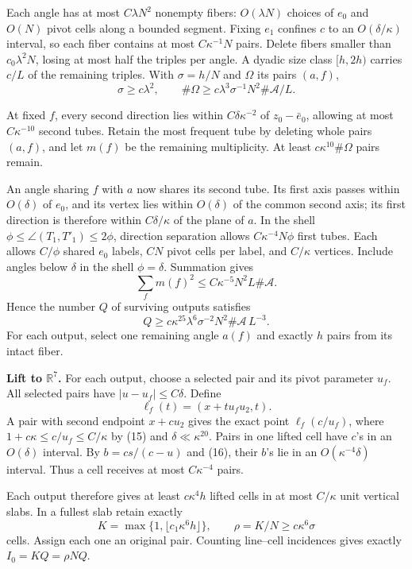 \documentclass[
  11pt,
  a4paper,
]{article}
\begin{document}
Each angle has at most \(C\lambda N^2\) nonempty fibers:
\(O(\lambda N)\) choices of \(e_0\) and \(O(N)\) pivot cells along a
bounded segment. Fixing \(e_1\) confines \(c\) to an
\(O(\delta/\kappa)\) interval, so each fiber contains at most
\(C\kappa^{-1}N\) pairs. Delete fibers smaller than \(c_0\lambda^2N\),
losing at most half the triples per angle. A dyadic size class
\([h,2h)\) carries \(c/L\) of the remaining triples. With \(\sigma=h/N\)
and \(\Omega\) its pairs \((a,f)\), \[
 \sigma\ge c\lambda^2,\qquad
 \#\Omega\ge c\lambda^3\sigma^{-1}N^2\#\mathcal A/L.
\tag{17}\label{eq:17}
\]

At fixed \(f\), every second direction lies within
\(C\delta\kappa^{-2}\) of \(z_0-\bar e_0\), allowing at most
\(C\kappa^{-10}\) second tubes. Retain the most frequent tube by
deleting whole pairs \((a,f)\), and let \(m(f)\) be the remaining
multiplicity. At least \(c\kappa^{10}\#\Omega\) pairs remain.

An angle sharing \(f\) with \(a\) now shares its second tube. Its first
axis passes within \(O(\delta)\) of \(e_0\), and its vertex lies within
\(O(\delta)\) of the common second axis; its first direction is
therefore within \(C\delta/\kappa\) of the plane of \(a\). In the shell
\(\phi\le\angle(T_1,T'_1)\le2\phi\), direction separation allows
\(C\kappa^{-4}N\phi\) first tubes. Each allows \(C/\phi\) shared \(e_0\)
labels, \(CN\) pivot cells per label, and \(C/\kappa\) vertices. Include
angles below \(\delta\) in the shell \(\phi=\delta\). Summation gives \[
 \sum_fm(f)^2\le C\kappa^{-5}N^2L\#\mathcal A.
\] Hence the number \(Q\) of surviving outputs satisfies \[
 Q\ge c\kappa^{25}\lambda^6\sigma^{-2}N^2
             \#\mathcal A\,L^{-3}.
\tag{18}\label{eq:18}
\] For each output, select one remaining angle \(a(f)\) and exactly
\(h\) pairs from its intact fiber.

\textbf{Lift to \(\mathbb R^7\).} For each output, choose a selected
pair and its pivot parameter \(u_f\). All selected pairs have
\(|u-u_f|\le C\delta\). Define \[
 \ell_f(t)=(x+t u_f u_2,t).
\] A pair with second endpoint \(x+c u_2\) gives the exact point
\(\ell_f(c/u_f)\), where \(1+c\kappa\le c/u_f\le C/\kappa\) by (15) and
\(\delta\ll\kappa^{20}\). Pairs in one lifted cell have \(c\)'s in an
\(O(\delta)\) interval. By \(b=cs/(c-u)\) and (16), their \(b\)'s lie in
an \(O(\kappa^{-4}\delta)\) interval. Thus a cell receives at most
\(C\kappa^{-4}\) pairs.

Each output therefore gives at least \(c\kappa^4h\) lifted cells in at
most \(C/\kappa\) unit vertical slabs. In a fullest slab retain exactly
\[
 K=\max\{1,\lfloor c_1\kappa^6h\rfloor\},\qquad
 \rho=K/N\ge c\kappa^6\sigma
\tag{19}\label{eq:19}
\] cells. Assign each one an original pair. Counting line--cell
incidences gives exactly \(I_0=KQ=\rho NQ\).
\end{document}
